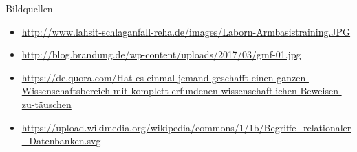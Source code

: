\documentclass[hyphens]{beamer}
\begin{document}
 \begin{frame}{Bildquellen}
\begin{itemize}
	\item \small{\url{http://www.lahsit-schlaganfall-reha.de/images/Laborn-Armbasistraining.JPG}}
	\item \small{\url{http://blog.brandung.de/wp-content/uploads/2017/03/gmf-01.jpg}}
	\item \small{\url{https://de.quora.com/Hat-es-einmal-jemand-geschafft-einen-ganzen-Wissenschaftsbereich-mit-komplett-erfundenen-wissenschaftlichen-Beweisen-zu-täuschen}}
	\item \small{\url{https://upload.wikimedia.org/wikipedia/commons/1/1b/Begriffe_relationaler_Datenbanken.svg}}
\end{itemize}
\end{frame}

 \titlepage
\end{document}

